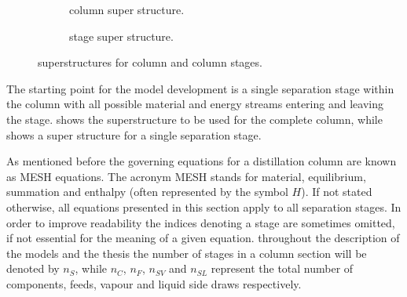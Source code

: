         \begin{figure}
            \centering
            \begin{subfigure}{0.3\textwidth}
                \centering
                
                \caption{column super structure.}
                \label{fig:col_super}
            \end{subfigure}
            \qquad
            \begin{subfigure}{0.6\textwidth}
                \centering
                
                \caption{stage super structure.}
                \label{fig:col_stage_super}
            \end{subfigure}
            \caption{superstructures for column and column stages.}
        \end{figure}

        The starting point for the model development is a single separation stage within the
        column with all possible material and energy streams entering and leaving the stage. 
        shows the superstructure to be used for the complete column, while  shows a super
        structure for a single separation stage.

        As mentioned before the governing equations for a distillation column are known as MESH equations. The acronym
        MESH stands for material, equilibrium, summation and enthalpy (often represented by the symbol $H$).
        If not stated otherwise, all equations presented in this section apply to all separation stages. In order
        to improve readability the indices denoting a stage are sometimes omitted, if not essential for the meaning of
        a given equation. throughout the description of the models and the thesis the number of stages in a column section
        will be denoted by $n_S$, while $n_C$, $n_F$, $n_{SV}$ and $n_{SL}$ represent the total number of components,
        feeds, vapour and liquid side draws respectively.


